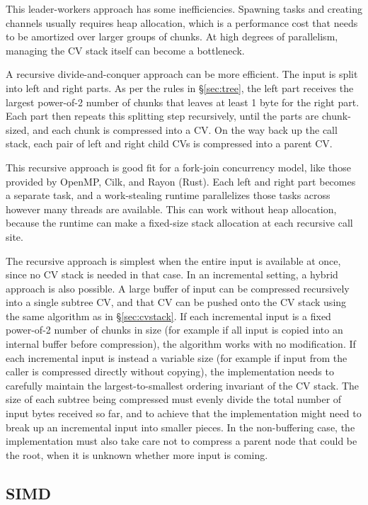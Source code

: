 \documentclass[11pt,notitlepage,a4paper]{article}
\begin{document}
This leader-workers approach has some inefficiencies. Spawning tasks and
creating channels usually requires heap allocation, which is a performance cost
that needs to be amortized over larger groups of chunks. At high degrees of
parallelism, managing the CV stack itself can become a bottleneck.

A recursive divide-and-conquer approach can be more efficient. The input is
split into left and right parts. As per the rules in \S\ref{sec:tree}, the left
part receives the largest power-of-2 number of chunks that leaves at least 1
byte for the right part. Each part then repeats this splitting step
recursively, until the parts are chunk-sized, and each chunk is compressed into
a CV. On the way back up the call stack, each pair of left and right child CVs
is compressed into a parent CV.

This recursive approach is good fit for a fork-join concurrency model, like
those provided by OpenMP, Cilk, and Rayon (Rust). Each left and right part
becomes a separate task, and a work-stealing runtime parallelizes those tasks
across however many threads are available. This can work without heap
allocation, because the runtime can make a fixed-size stack allocation at each
recursive call site.

The recursive approach is simplest when the entire input is available at once,
since no CV stack is needed in that case. In an incremental setting, a hybrid
approach is also possible. A large buffer of input can be compressed
recursively into a single subtree CV, and that CV can be pushed onto the CV
stack using the same algorithm as in \S\ref{sec:cvstack}. If each incremental
input is a fixed power-of-2 number of chunks in size (for example if all input
is copied into an internal buffer before compression), the algorithm works with
no modification. If each incremental input is instead a variable size (for
example if input from the caller is compressed directly without copying), the
implementation needs to carefully maintain the largest-to-smallest ordering
invariant of the CV stack. The size of each subtree being compressed must
evenly divide the total number of input bytes received so far, and to achieve
that the implementation might need to break up an incremental input into
smaller pieces. In the non-buffering case, the implementation must also take
care not to compress a parent node that could be the root, when it is unknown
whether more input is coming.

\subsection{SIMD}\label{sec:simd}
\end{document}
